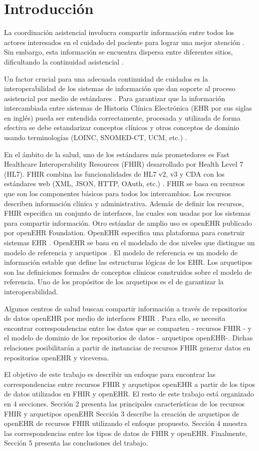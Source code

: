 \section{Introducción}

La coordinación asistencial involucra compartir información entre todos los actores interesados en el cuidado del paciente para lograr una mejor atención \cite{CareCoordination}. Sin embargo, esta información se encuentra dispersa entre diferentes sitios, dificultando la continuidad asistencial \cite{Indarte11}.

Un factor crucial para una adecuada continuidad de cuidados es la interoperabilidad de los sistemas de información que dan soporte al proceso asistencial por medio de estándares \cite{OPS16}. Para garantizar que la información intercambiada entre sistemas de Historia Clínica Electrónica (EHR por sus siglas en inglés) pueda ser entendida correctamente, procesada y utilizada de forma efectiva se debe estandarizar conceptos clínicos y otros conceptos de dominio usando terminologías (LOINC, SNOMED-CT, UCM, etc.) \cite{ISO20514}.

En el ámbito de la salud, uno de los estándares más prometedores es Fast Healthcare Interoperability Resources (FHIR) desarrollado por Health Level 7 (HL7). FHIR combina las funcionalidades de HL7 v2, v3 y CDA con los estándares web (XML, JSON, HTTP, OAuth, etc.) \cite{FHIR}. FHIR se basa en recursos que son los componentes básicos para todos los intercambios. Los recursos describen información clínica y administrativa. Además de definir los recursos, FHIR especifica un conjunto de interfaces, las cuales son usadas por los sistemas para compartir información. Otro estándar de amplio uso es openEHR publicado por openEHR Foundation. OpenEHR especifica una plataforma para construir sistemas EHR \cite{openEHR}. OpenEHR se basa en el modelado de dos niveles que distingue un modelo de referencia y arquetipos \cite{Bale00}. El modelo de referencia es un modelo de información estable que define las estructuras lógicas de los EHR. Los arquetipos son las definiciones formales de conceptos clínicos construidos sobre el modelo de referencia. Uno de los propósitos de los arquetipos es el de garantizar la interoperabilidad.

Algunos centros de salud buscan compartir información a través de repositorios de datos openEHR por medio de interfaces FHIR \cite{Lopez16}. Para ello, se necesita encontrar correspondencias entre los datos que se comparten - recursos FHIR - y el modelo de dominio de los repositorios de datos - arquetipos openEHR-. Dichas relaciones posibilitarán a partir de instancias de recursos FHIR generar datos en repositorios openEHR y viceversa.

El objetivo de este trabajo es describir un enfoque para encontrar las correspondencias entre recursos FHIR y arquetipos openEHR a partir de los tipos de datos utilizados en FHIR y openEHR. El resto de este trabajo está organizado en 4 secciones. Sección 2 presenta las principales características de los recursos FHIR y arquetipos openEHR Sección 3 describe la creación de arquetipos de openEHR de recursos FHIR utilizando el enfoque propuesto. Sección 4 muestra las correspondencias entre los tipos de datos de FHIR y openEHR. Finalmente, Sección 5 presenta las conclusiones del trabajo.
